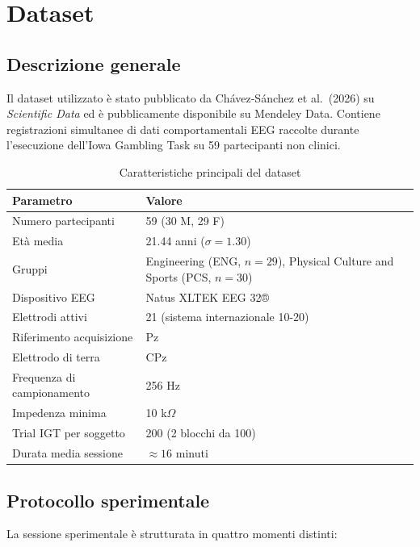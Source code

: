 \documentclass[12pt, a4paper]{article}
\begin{document}
\section{Dataset}

\subsection{Descrizione generale}

Il dataset utilizzato è stato pubblicato da Chávez-Sánchez et al.\ (2026) su \textit{Scientific Data} ed è pubblicamente disponibile su Mendeley Data. Contiene registrazioni simultanee di dati comportamentali EEG raccolte durante l'esecuzione dell'Iowa Gambling Task su 59 partecipanti non clinici.

\begin{table}[h!]
\centering
\caption{Caratteristiche principali del dataset}
\begin{tabular}{ll}
\toprule
\textbf{Parametro} & \textbf{Valore} \\
\midrule
Numero partecipanti & 59 (30 M, 29 F) \\
Età media & 21.44 anni ($\sigma = 1.30$) \\
Gruppi & Engineering (ENG, $n=29$), Physical Culture and Sports (PCS, $n=30$) \\
Dispositivo EEG & Natus XLTEK EEG 32® \\
Elettrodi attivi & 21 (sistema internazionale 10-20) \\
Riferimento acquisizione & Pz \\
Elettrodo di terra & CPz \\
Frequenza di campionamento & 256 Hz \\
Impedenza minima & 10 k$\Omega$ \\
Trial IGT per soggetto & 200 (2 blocchi da 100) \\
Durata media sessione & $\approx 16$ minuti \\
\bottomrule
\end{tabular}
\end{table}

\subsection{Protocollo sperimentale}

La sessione sperimentale è strutturata in quattro momenti distinti:
\end{document}
